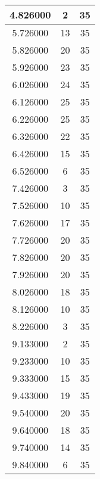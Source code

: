 \begin{longtable}[htbp]{|c|c|c|}
4.826000 & 2 & 35 \\ \hline
5.726000 & 13 & 35 \\ \hline
5.826000 & 20 & 35 \\ \hline
5.926000 & 23 & 35 \\ \hline
6.026000 & 24 & 35 \\ \hline
6.126000 & 25 & 35 \\ \hline
6.226000 & 25 & 35 \\ \hline
6.326000 & 22 & 35 \\ \hline
6.426000 & 15 & 35 \\ \hline
6.526000 & 6 & 35 \\ \hline
7.426000 & 3 & 35 \\ \hline
7.526000 & 10 & 35 \\ \hline
7.626000 & 17 & 35 \\ \hline
7.726000 & 20 & 35 \\ \hline
7.826000 & 20 & 35 \\ \hline
7.926000 & 20 & 35 \\ \hline
8.026000 & 18 & 35 \\ \hline
8.126000 & 10 & 35 \\ \hline
8.226000 & 3 & 35 \\ \hline
9.133000 & 2 & 35 \\ \hline
9.233000 & 10 & 35 \\ \hline
9.333000 & 15 & 35 \\ \hline
9.433000 & 19 & 35 \\ \hline
9.540000 & 20 & 35 \\ \hline
9.640000 & 18 & 35 \\ \hline
9.740000 & 14 & 35 \\ \hline
9.840000 & 6 & 35 \\ \hline
\end{longtable}

